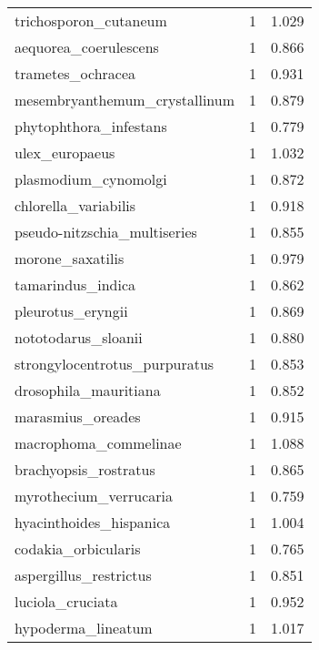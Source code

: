 \begin{tabular}{lrr}
          trichosporon\_cutaneum &                   1 &     1.029 \\
          aequorea\_coerulescens &                   1 &     0.866 \\
              trametes\_ochracea &                   1 &     0.931 \\
  mesembryanthemum\_crystallinum &                   1 &     0.879 \\
         phytophthora\_infestans &                   1 &     0.779 \\
                 ulex\_europaeus &                   1 &     1.032 \\
           plasmodium\_cynomolgi &                   1 &     0.872 \\
           chlorella\_variabilis &                   1 &     0.918 \\
   pseudo-nitzschia\_multiseries &                   1 &     0.855 \\
               morone\_saxatilis &                   1 &     0.979 \\
              tamarindus\_indica &                   1 &     0.862 \\
              pleurotus\_eryngii &                   1 &     0.869 \\
            nototodarus\_sloanii &                   1 &     0.880 \\
  strongylocentrotus\_purpuratus &                   1 &     0.853 \\
          drosophila\_mauritiana &                   1 &     0.852 \\
              marasmius\_oreades &                   1 &     0.915 \\
          macrophoma\_commelinae &                   1 &     1.088 \\
          brachyopsis\_rostratus &                   1 &     0.865 \\
         myrothecium\_verrucaria &                   1 &     0.759 \\
        hyacinthoides\_hispanica &                   1 &     1.004 \\
            codakia\_orbicularis &                   1 &     0.765 \\
         aspergillus\_restrictus &                   1 &     0.851 \\
               luciola\_cruciata &                   1 &     0.952 \\
             hypoderma\_lineatum &                   1 &     1.017 \\

\end{tabular}
